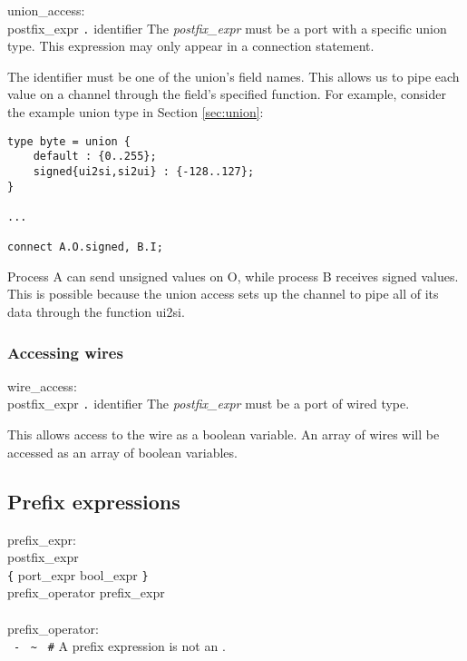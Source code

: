 \grammarstart
union\_access: \\
      \>postfix\_expr {\tt{}.} identifier
\grammarend
The {\it{}postfix\_expr} must be a port with a specific union type.
This expression may only appear in a connection statement.

The identifier must be one of the union's field names.
This allows us to pipe each value on a channel through the field's
specified function.
For example, consider the example union type in Section \ref{sec:union}:
\begin{verbatim}
type byte = union {
    default : {0..255};
    signed{ui2si,si2ui} : {-128..127};
}

...

connect A.O.signed, B.I;
\end{verbatim}

Process A can send unsigned values on O, while process B receives signed values.
This is possible because the union access sets up the channel to pipe all of
its data through the function ui2si.

\subsubsection{Accessing wires}\label{sec:wireaccess}

\grammarstart
wire\_access: \\
      \>postfix\_expr {\tt{}.} identifier
\grammarend
The {\it{}postfix\_expr} must be a port of wired type.

This allows access to the wire as a boolean variable.  An array of wires
will be accessed as an array of boolean variables.


\subsection{Prefix expressions}\label{sec:prefix}

\grammarstart
prefix\_expr: \\
       \>postfix\_expr \\
\orbox \>{\tt{}\#} \verb|{| port\_expr\LIST {\tt{}:} bool\_expr \verb|}| \\
\orbox \>prefix\_operator prefix\_expr \\
 \\
prefix\_operator: \\
      \>{\tt{}+}  \orbox \ {\tt{}-}  \orbox \ \verb|~|  \orbox \ {\tt{}\#}
\grammarend
A prefix expression is not an \lvalue.

